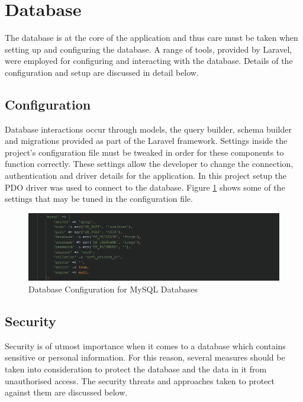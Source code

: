 \section{Database}
The database is at the core of the application and thus care must be taken when setting up and configuring the database. A range of tools, provided by Laravel, were employed for configuring and interacting with the database. Details of the configuration and setup are discussed in detail below.

\subsection{Configuration}
Database interactions occur through models, the query builder, schema builder and migrations provided as part of the Laravel framework. Settings inside the project's configuration file must be tweaked in order for these components to function correctly. These settings allow the developer to change the connection, authentication and driver details for the application. In this project setup the PDO driver was used to connect to the database. Figure \ref{fig:DatabaseConfig} shows some of the settings that may be tuned in the configuration file.

\begin{figure}[H]
	\centering
	\includegraphics[width=\textwidth]{Images/Implementation/MySQLConfig}
	\caption{Database Configuration for MySQL Databases} \label{fig:DatabaseConfig}
\end{figure}


\subsection{Security}
Security is of utmost importance when it comes to a database which contains sensitive or personal information. For this reason, several measures should be taken into consideration to protect the database and the data in it from unauthorised access. The security threats and approaches taken to protect against them are discussed below.

